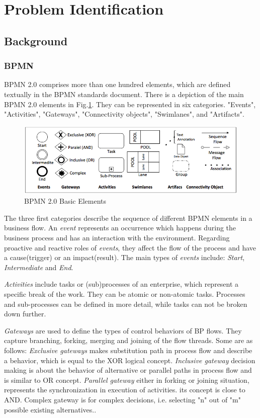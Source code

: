 \documentclass{article}
\begin{document}
\section{Problem Identification}\label{sec:pd}

\subsection{Background}
\subsubsection{BPMN}
BPMN 2.0 comprises more than one hundred elements, which are defined textually in the BPMN standards document. There is a depiction of the main BPMN 2.0 elements  \cite{Bpmn13} in Fig.\ref{fig:figure1}. They can be represented in six categories. "Events", "Activities",  "Gateways", "Connectivity objects", "Swimlanes", and "Artifacts". 

\begin{figure}
\centering%
\includegraphics[scale=0.45]{BPMN_Symbols.png}
\caption{BPMN 2.0 Basic Elements} 
\label{fig:figure1}
\end{figure}

The three first categories describe the sequence of different BPMN elements in a business flow. An \textit{event} represents an occurrence which happens during the business process and has an interaction with the environment. Regarding proactive and reactive roles of \textit{events}, they affect the flow of the process and  have a cause(trigger) or an impact(result). The main types of \textit{events} include: \textit{Start}, \textit{Intermediate} and \textit{End}.

\textit{Activities} include tasks or (sub)processes of an enterprise, which represent a specific break of the work. They can be atomic or non-atomic tasks. Processes and sub-processes can be defined in more detail, while tasks can not be broken down further.

\textit{Gateways} are used to define the types of control behaviors of  BP flows. They capture  branching, forking, merging and joining of the flow threads. Some are as follows:
\textit{Exclusive gateways} makes substitution path in process flow and describe a behavior, which is equal to the XOR logical concept. 
\textit{Inclusive gateway} decision making is about the behavior of alternative or parallel paths in process flow and is similar to OR concept.
\textit{Parallel gateway} either in forking or joining situation, represents the synchronization in execution of activities. its concept is close to AND.
Complex gateway is for complex decisions, i.e. selecting "n" out of "m" possible existing alternatives.. 
\end{document}

